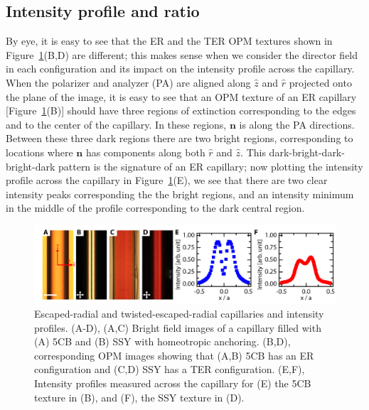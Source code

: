 \subsection{Intensity profile and ratio}
By eye, it is easy to see that the ER and the TER OPM textures shown in Figure~\ref{f:4-StraightCaps}(B,D) are different; this makes sense when we consider the director field in each configuration and its impact on the intensity profile across the capillary.
When the polarizer and analyzer (PA) are aligned along $\hat{z}$ and $\hat{r}$ projected onto the plane of the image, it is easy to see that an OPM texture of an ER capillary [Figure~\ref{f:4-StraightCaps}(B)] should have three regions of extinction corresponding to the edges and  to the center of the capillary.
In these regions, $\mathbf{n}$ is along the PA directions.
Between these three dark regions there are two bright regions, corresponding to locations where $\mathbf{n}$ has components along both $\hat{r}$ and $\hat{z}$.
This dark-bright-dark-bright-dark pattern is the signature of an ER capillary; now plotting the intensity profile across the capillary in Figure~\ref{f:4-StraightCaps}(E), we see that there are two clear intensity peaks corresponding the the bright regions, and an intensity minimum in the middle of the profile corresponding to the dark central region.
\begin{figure}
  \centering
  \includegraphics{figures/C4/Ch4-Figs_StraightCaps.png}
  \caption{Escaped-radial and twisted-escaped-radial capillaries and intensity profiles.
  (A-D), (A,C) Bright field images of a capillary filled with (A) 5CB and (B) SSY with homeotropic anchoring. (B,D), corresponding OPM images showing that (A,B) 5CB has an ER configuration and (C,D) SSY has a TER configuration.
  (E,F), Intensity profiles measured across the capillary for (E) the 5CB texture in (B), and (F), the SSY texture in (D).}\label{f:4-StraightCaps}
\end{figure}

